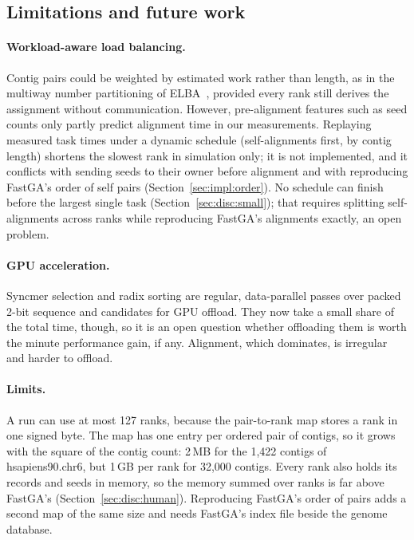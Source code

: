 \subsection{Limitations and future work}\label{sec:disc:future}

\paragraph{Workload-aware load balancing.}
Contig pairs could be weighted by estimated work rather than length, as
in the multiway number partitioning of ELBA~\cite{elba}, provided every
rank still derives the assignment without communication. However,
pre-alignment features such as seed counts only partly predict alignment
time in our measurements. Replaying measured task times under a dynamic
schedule (self-alignments first, by contig length) shortens the slowest
rank in simulation only; it is not implemented, and it conflicts with
sending seeds to their owner before alignment and with reproducing FastGA's
order of self pairs (Section~\ref{sec:impl:order}). No schedule can finish
before the largest single task (Section~\ref{sec:disc:small}); that
requires splitting self-alignments across ranks while reproducing FastGA's alignments exactly, an open problem.

\paragraph{GPU acceleration.}
Syncmer selection and radix sorting are regular, data-parallel passes over
packed 2-bit sequence and candidates for GPU offload. They now take a small
share of the total time, though, so it is an open question whether
offloading them is worth the minute performance gain, if any. Alignment, which dominates, is
irregular and harder to offload.

\paragraph{Limits.}
A run can use at most 127 ranks, because the pair-to-rank map stores a rank
in one signed byte. The map has one entry per ordered pair of contigs, so it
grows with the square of the contig count: 2\,MB for the 1,422 contigs of
hsapiens90.chr6, but 1\,GB per rank for 32,000 contigs. Every rank also
holds its records and seeds in memory, so the memory summed over ranks is
far above FastGA's (Section~\ref{sec:disc:human}). Reproducing FastGA's
order of pairs adds a second map of the same size and needs FastGA's index
file beside the genome database.
